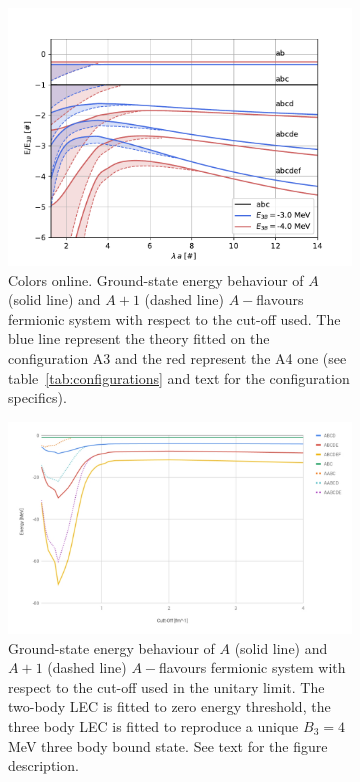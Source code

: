 \documentclass[preprint,12pt]{elsarticle}
\newcommand{\tabref}[1]{table~\ref{#1}}
\begin{document}
\begin{figure}
    \centering
    \begin{subfigure}[t]{0.45\textwidth}
        \centering
        \includegraphics[width=\linewidth]{./p-systems-vs-l} 
        \caption{Colors online. Ground-state energy behaviour of $A$ (solid line) and $A+1$ (dashed line) $A-$flavours fermionic system with respect to the cut-off used. The blue line represent the theory fitted on the configuration A3 and the red represent the A4 one (see \tabref{tab:configurations} and text for the configuration specifics). }
        \label{fig:treshold}
    \end{subfigure}
    \hfill
    \begin{subfigure}[t]{0.45\textwidth}
        \centering
        \includegraphics[width=\linewidth]{./unitarity_chart} 
        \caption{Ground-state energy behaviour of $A$ (solid line) and $A+1$ (dashed line) $A-$flavours fermionic system with respect to the cut-off used in the unitary limit. The two-body LEC is fitted to zero energy threshold, the three body LEC is fitted to reproduce a unique $B_3=4$ MeV three body bound state. See text for the figure description.}  
        \label{fig:unitary}
    \end{subfigure}
\caption{}
\end{figure} 
\end{document}
